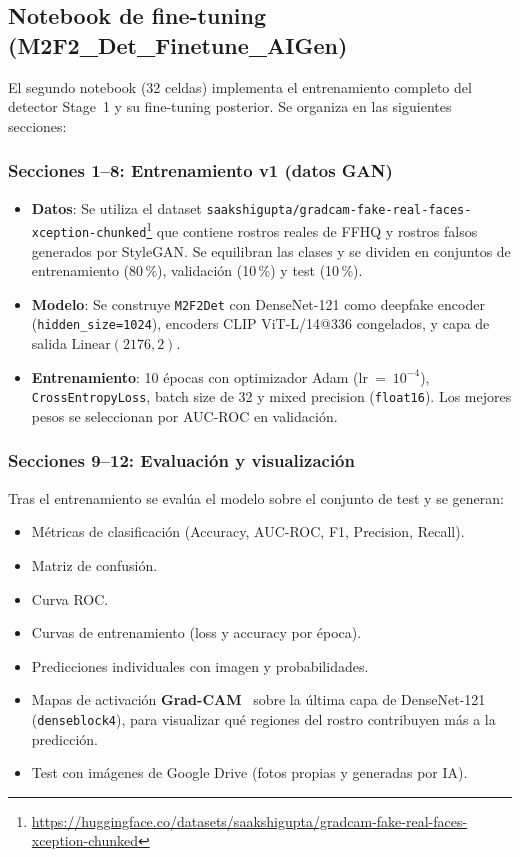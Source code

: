 \documentclass[pdflatex,sn-mathphys-num]{sn-jnl}
\begin{document}
\subsection{Notebook de fine-tuning (M2F2\_Det\_Finetune\_AIGen)}\label{subsec:finetune}

El segundo notebook (32 celdas) implementa el entrenamiento completo del detector Stage~1 y su fine-tuning posterior. Se organiza en las siguientes secciones:

\subsubsection{Secciones 1--8: Entrenamiento v1 (datos GAN)}\label{subsubsec:trainv1}

\begin{itemize}
    \item \textbf{Datos}: Se utiliza el dataset \texttt{saakshigupta/gradcam-fake-real-faces-xception-chunked}\footnote{\url{https://huggingface.co/datasets/saakshigupta/gradcam-fake-real-faces-xception-chunked}} que contiene rostros reales de FFHQ y rostros falsos generados por StyleGAN. Se equilibran las clases y se dividen en conjuntos de entrenamiento (80\,\%), validación (10\,\%) y test (10\,\%).

    \item \textbf{Modelo}: Se construye \texttt{M2F2Det} con DenseNet-121 como deepfake encoder (\texttt{hidden\_size=1024}), encoders CLIP ViT-L/14@336 congelados, y capa de salida $\text{Linear}(2176, 2)$.

    \item \textbf{Entrenamiento}: 10 épocas con optimizador Adam (lr~=~$10^{-4}$), \texttt{CrossEntropyLoss}, batch size de 32 y mixed precision (\texttt{float16}). Los mejores pesos se seleccionan por AUC-ROC en validación.
\end{itemize}

\subsubsection{Secciones 9--12: Evaluación y visualización}\label{subsubsec:eval}

Tras el entrenamiento se evalúa el modelo sobre el conjunto de test y se generan:
\begin{itemize}
    \item Métricas de clasificación (Accuracy, AUC-ROC, F1, Precision, Recall).
    \item Matriz de confusión.
    \item Curva ROC.
    \item Curvas de entrenamiento (loss y accuracy por época).
    \item Predicciones individuales con imagen y probabilidades.
    \item Mapas de activación \textbf{Grad-CAM}~\cite{selvaraju2017gradcam} sobre la última capa de DenseNet-121 (\texttt{denseblock4}), para visualizar qué regiones del rostro contribuyen más a la predicción.
    \item Test con imágenes de Google Drive (fotos propias y generadas por IA).
\end{itemize}
\end{document}
